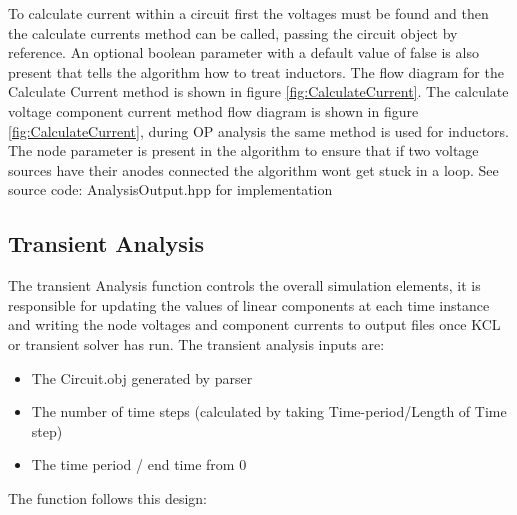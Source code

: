 \documentclass{article}
\begin{document}
To calculate current within a circuit first the voltages must be found and then the calculate currents method can be called, passing the circuit object by reference. An optional boolean parameter with a default value of false is also present that tells the algorithm how to treat inductors. The flow diagram for the Calculate Current method is shown in figure \ref{fig:CalculateCurrent}. The calculate voltage component current method flow diagram is shown in figure \ref{fig:CalculateCurrent}, during OP analysis the same method is used for inductors. The node parameter is present in the algorithm to ensure that if two voltage sources have their anodes connected the algorithm wont get stuck in a loop. 
\bigbreak
See source code: AnalysisOutput.hpp for implementation

\newpage

\subsection{Transient Analysis}\label{ssec:TransientAnalysis}
The transient Analysis function controls the overall simulation elements, it is responsible for updating the values of linear components at each time instance and writing the node voltages and component currents to output files once KCL or transient solver has run. The transient analysis inputs are: 
\begin{itemize}
    \item The Circuit.obj generated by parser
    \item The number of time steps (calculated by taking Time-period/Length of Time step) 
    \item The time period / end time from 0 
\end{itemize}
The function follows this design:
\end{document}
